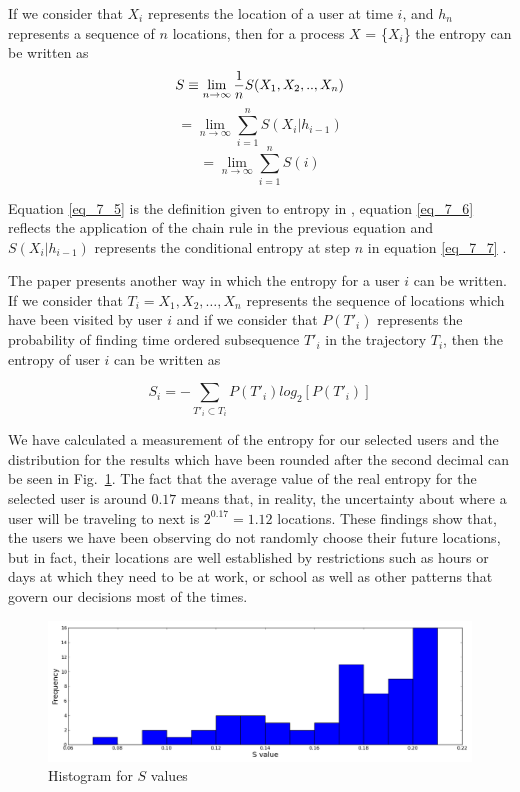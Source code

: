 If we consider that $X_{i}$ represents the location of a user at time $i$,
and $h_{n}$ represents a sequence of $n$ locations, then for a process $X$ =
\{$X_{i}$\} the entropy can be written as
\begin{equation}
\label{eq_7_5}
S \equiv \lim_{n\to\infty} {1 \over n}S(X_{1},X_{2},..,X_{n})
\end{equation} 
\begin{equation}
\label{eq_7_6}
= \lim_{n\to\infty} \sum\limits_{i=1}^{n} S(X_{i}|h_{i-1})
\end{equation}
\begin{equation}
\label{eq_7_7}
= \lim_{n\to\infty} \sum\limits_{i=1}^{n} S(i)
\end{equation}

Equation \ref{eq_7_5} is the definition given to entropy in
\cite{Cover:2006:EIT:1146355}, equation \ref{eq_7_6} reflects the application of
the chain rule in the previous equation and $S(X_{i}|h_{i-1})$ represents the
conditional entropy at step $n$ in equation \ref{eq_7_7} \cite{song2010limits}.

The paper \cite{Barabasi10} presents another way in which the entropy for a user
$i$ can be written. If we consider that $T_{i} = {X_{1}, X_{2},\ldots, X_{n}}$
represents the sequence of locations which have been visited by user $i$ and if
we consider that $P(T'_{i})$ represents the probability of finding time ordered
subsequence $T'_{i}$ in the trajectory $T_{i}$, then the entropy of user $i$ can
be written as

\begin{equation}
S_{i} = - \sum\limits_{T'_{i}\subset T_{i}}P(T'_{i})log_{2}[P(T'_{i})]
\end{equation}

We have calculated a measurement of the entropy for our selected users and the
distribution for the results which have been rounded after the second decimal
can be seen in Fig.~\ref{dis_full_e}. The fact that the average value of the
real entropy for the selected user is around $0.17$ means that, in reality, the
uncertainty about where a user will be traveling to next is $2^{0.17} = 1.12$
locations. These findings show that, the users we have been observing do not
randomly choose their future locations, but in fact, their locations are well
established by restrictions such as hours or days at which they need to be at
work, or school as well as other patterns that govern our decisions most of the
times.

\begin{figure}[!h]
\centering
\includegraphics[width=\textwidth]{figures/entro_pred/full_entro_distrib.png}
\caption{Histogram for $S$ values}
\label{dis_full_e}
\end{figure}

